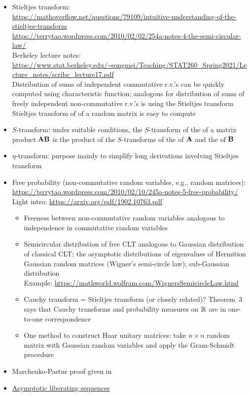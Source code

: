 \documentclass[10pt]{article}
\begin{document}
\begin{itemize}

\item
Stieltjes transform: \\
\url{https://mathoverflow.net/questions/79109/intuitive-understanding-of-the-stieltjes-transform} \\
\url{https://terrytao.wordpress.com/2010/02/02/254a-notes-4-the-semi-circular-law/} \\
Berkeley lecture notes: \url{https://www.stat.berkeley.edu/~songmei/Teaching/STAT260_Spring2021/Lecture_notes/scribe_lecture17.pdf} \\
Distribution of sums of independent commutative r.v.'s can be quickly computed using characteristic function; analogous for distribution of sums of freely independent non-commutative r.v.'s is using the Stieltjes transform \\
Stieltjes transform of \esd of a random matrix is easy to compute \citep{Couillet:2011}

\item
$S$-transform: under suitable conditions, the $S$-transform of the \lsd of a matrix product $\mathbf{A}\mathbf{B}$ is the product of the $S$-transforms of the \lsd of $\mathbf{A}$ and the \lsd of $\mathbf{B}$ \citep{Couillet:2011}

\item
$\eta$-transform: purpose mainly to simplify long derivations involving Stieltjes transform \citep{Couillet:2011}

\item
Free probability (non-commutative random variables, e.g., random matrices): \\
\url{https://terrytao.wordpress.com/2010/02/10/245a-notes-5-free-probability/} \\
Light intro: \url{https://arxiv.org/pdf/1902.10763.pdf} \citep{Xia:2019}
\begin{itemize}
\item
Freeness between non-commutative random variables analogous to independence in commutative random variables
\item
Semicircular distribution of free CLT analogous to Gaussian distribution of classical CLT; the asymptotic distributions of eigenvalues of Hermition Gaussian random matrices (Wigner's semi-circle law); sub-Gaussian distribution \\
Example: \url{https://mathworld.wolfram.com/WignersSemicircleLaw.html}
\item
Cauchy transform = Stieltjes transform (or closely related)? Theorem~3 says that Cauchy transforms and probability measures on $\mathbb{R}$ are in one-to-one correspondence
\item
One method to construct Haar unitary matrices: take $n\times n$ random matrix with \iid Gaussian random variables and apply the Gram-Schmidt procedure
\end{itemize}

\item
Marchenko-Pastur proof given in \citep{Couillet:2011}

\item
\href{https://arxiv.org/pdf/1302.5688.pdf}{Asymptotic liberating sequences}

\end{itemize}
\end{document}
